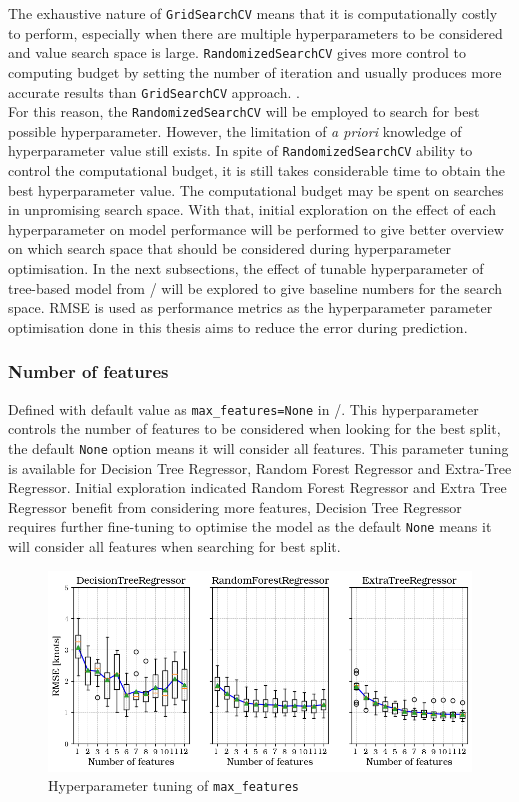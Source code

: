 The exhaustive nature of {\tt GridSearchCV} means that it is computationally costly to perform, especially when there are multiple hyperparameters to be considered and value search space is large. {\tt RandomizedSearchCV} gives more control to computing budget by setting the number of iteration and usually produces more accurate results than {\tt GridSearchCV} approach. . \\

For this reason, the {\tt RandomizedSearchCV} will be employed to search for best possible hyperparameter. However, the limitation of \emph{a priori} knowledge of hyperparameter value still exists. In spite of {\tt RandomizedSearchCV} ability to control the computational budget, it is still takes considerable time to obtain the best hyperparameter value. The computational budget may be spent on searches in unpromising search space. With that, initial exploration on the effect of each hyperparameter on model performance will be performed to give better overview on which search space that should be considered during hyperparameter optimisation. In the next subsections, the effect of tunable hyperparameter of tree-based model from \scikit/ will be explored to give baseline numbers for the search space. RMSE is used as performance metrics as the hyperparameter parameter optimisation done in this thesis aims to reduce the error during prediction. \\ 

\subsubsection*{Number of features}\label{sec:max_features}

Defined with default value as {\tt max\_features=None} in \scikit/. This hyperparameter controls the number of features to be considered when looking for the best split, the default {\tt None} option means it will consider all features. This parameter tuning is available for Decision Tree Regressor, Random Forest Regressor and Extra-Tree Regressor. Initial exploration indicated Random Forest Regressor and Extra Tree Regressor benefit from considering more features, Decision Tree Regressor requires further fine-tuning to optimise the model as the default {\tt None} means it will consider all features when searching for best split.\\ 

\begin{figure}[h]
    \centering
        \includegraphics[width=.85\textwidth]{02_figures/hpo_n_features.png}
        \caption{Hyperparameter tuning of {\tt max\_features}}
        \label{fig:hpo_n_features}
\end{figure}

